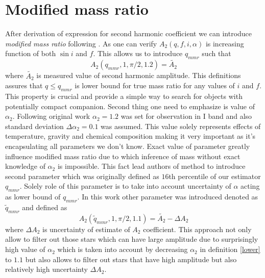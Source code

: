 \documentclass{pracalicmgr}
\begin{document}
\section{Modified mass ratio}
\hspace{1cm} After derivation of expression for second harmonic coefficient we can introduce {\it modified mass ratio} following \citep{gomel_search_2021-1}. 
As one can verify $A_2(q,f,i,\alpha)$ is increasing 
function of both $\sin{i}$ and $f$. This allows us to introduce $q_{mmr}$ such that
\begin{equation}\label{qmmr}
    A_2(q_{mmr},1,\pi/2,1.2)=\tilde{A_2}
\end{equation}
where $\tilde{A_2}$ is measured value of second harmonic amplitude.
This definitions assures that $q\leq q_{mmr}$ is lower bound for true mass ratio for any values of $i$ and $f$. 
This property is crucial and provide a simple way to search for objects with potentially compact companion. Second thing 
one need to emphasize is value of $\alpha_2$. Following original work $\alpha_2=1.2$ was set for observation in I band and also standard deviation $\Delta\alpha_2=0.1$
was assumed. This value
solely represents effects of temperature, gravity and chemical composition making it very important as it's encapsulating all parameters we don't know. 
Exact value of parameter greatly influence modified mass ratio due to which inference of mass without exact knowledge of $\alpha_2$ is impossible.
This fact lead authors of method to introduce second parameter which was originally defined as $16$th percentile of our estimator $q_{mmr}$. Solely role of this 
parameter is to take into account uncertainty of $\alpha$ acting as lower bound of $q_{mmr}$. In this work other parameter was introduced denoted as $\tilde{q}_{mmr}$ and defined as
\begin{equation*}\label{lower}
    A_2(\tilde{q}_{mmr},1,\pi/2,1.1)=\tilde{A_2}-\Delta A_2
\end{equation*}
where $\Delta A_2$ is uncertainty of estimate of $A_2$ coefficient. This approach not only allow to filter out those stars which can have large amplitude due to 
surprisingly high value of $\alpha_2$ which is taken into account by decreasing $\alpha_2$ in definition \ref{lower} to $1.1$ but also allows to filter out stars
that have high amplitude but also relatively high uncertainty $\Delta A_2$.
\end{document}

